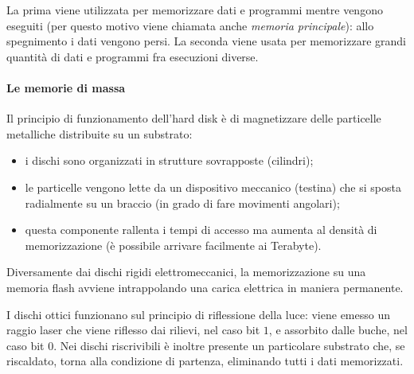 \documentclass[class=book, crop=false, oneside]{standalone}
\begin{document}
La prima viene utilizzata per memorizzare dati e programmi mentre vengono eseguiti (per questo motivo viene chiamata anche \emph{memoria principale}): allo spegnimento i dati vengono persi.
La seconda viene usata per memorizzare grandi quantità di dati e programmi fra esecuzioni diverse.

\paragraph{Le memorie di massa}
Il principio di funzionamento dell'hard disk è di magnetizzare delle particelle metalliche distribuite su un substrato:
\begin{itemize}[noitemsep]
	\item i dischi sono organizzati in strutture sovrapposte (cilindri);
	\item le particelle vengono lette da un dispositivo meccanico (testina) che si sposta radialmente su un braccio (in grado di fare movimenti angolari);
	\item questa componente rallenta i tempi di accesso ma aumenta al densità di memorizzazione (è possibile arrivare facilmente ai Terabyte).
\end{itemize}
Diversamente dai dischi rigidi elettromeccanici, la memorizzazione su una memoria flash avviene intrappolando una carica elettrica in maniera permanente.

I dischi ottici funzionano sul principio di riflessione della luce: viene emesso un raggio laser che viene riflesso dai rilievi, nel caso bit \(1\), e assorbito dalle buche, nel caso bit \(0\).
Nei dischi riscrivibili è inoltre presente un particolare substrato che, se riscaldato, torna alla condizione di partenza, eliminando tutti i dati memorizzati.
\end{document}
